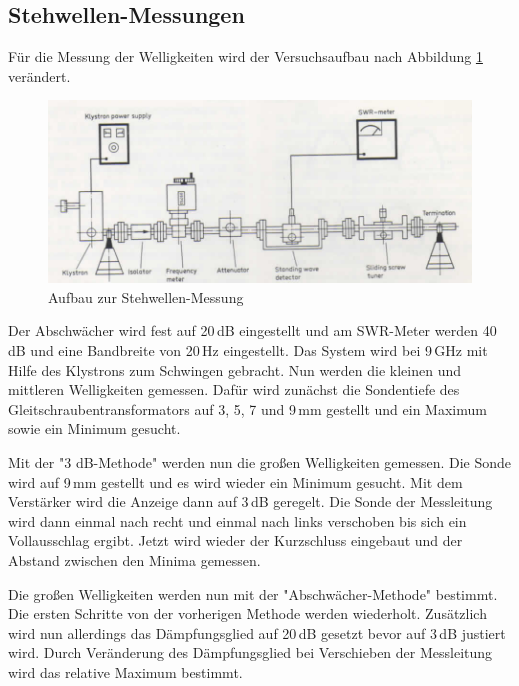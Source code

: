     \subsection{Stehwellen-Messungen}
    Für die Messung der Welligkeiten wird der Versuchsaufbau nach Abbildung \ref{fig:aufbauV3} verändert.
    \begin{figure}
      \centering
      \includegraphics[scale=0.8]{pictures/aubauV3.png}
      \caption{Aufbau zur Stehwellen-Messung}
      \label{fig:aufbauV3}
    \end{figure}
    Der Abschwächer wird fest auf 20\,dB eingestellt und am SWR-Meter werden 40\,dB und eine Bandbreite von 20\,Hz eingestellt.
    Das System wird bei 9\,GHz mit Hilfe des Klystrons zum Schwingen gebracht.
    Nun werden die kleinen und mittleren Welligkeiten gemessen.
    Dafür wird zunächst die Sondentiefe des Gleitschraubentransformators auf 3, 5, 7 und 9\,mm gestellt und ein Maximum sowie ein Minimum gesucht.

    Mit der "3 dB-Methode" werden nun die großen Welligkeiten gemessen.
    Die Sonde wird auf 9\,mm gestellt und es wird wieder ein Minimum gesucht.
    Mit dem Verstärker wird die Anzeige dann auf 3\,dB geregelt.
    Die Sonde der Messleitung wird dann einmal nach recht und einmal nach links verschoben bis sich ein Vollausschlag ergibt.
    Jetzt wird wieder der Kurzschluss eingebaut und der Abstand zwischen den Minima gemessen.

    Die großen Welligkeiten werden nun mit der "Abschwächer-Methode" bestimmt.
    Die ersten Schritte von der vorherigen Methode werden wiederholt.
    Zusätzlich wird nun allerdings das Dämpfungsglied auf 20\,dB gesetzt bevor auf 3\,dB justiert wird.
    Durch Veränderung des Dämpfungsglied bei Verschieben der Messleitung wird das relative Maximum bestimmt.
